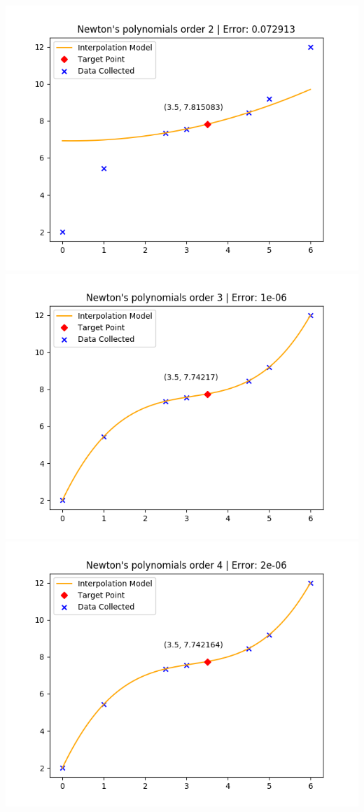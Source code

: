 \documentclass[12pt]{article}
\begin{document}
\begin{center}
        \includegraphics{Order2.png}
        \includegraphics{Order3.png}
        \includegraphics{Order4.png}

\end{center}
\end{document}
